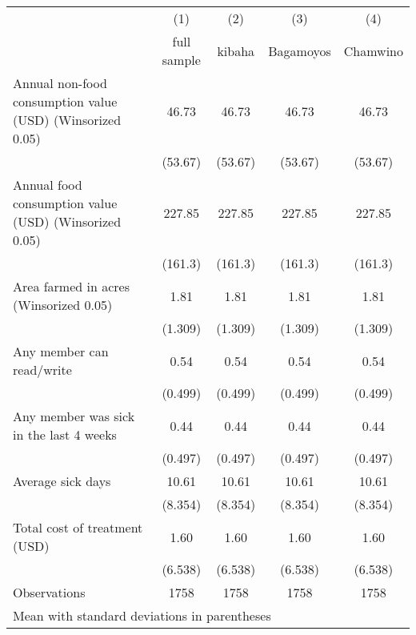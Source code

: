 {
\def\sym#1{\ifmmode^{#1}\else\(^{#1}\)\fi}
\begin{tabular}{l*{4}{c}}
\hline\hline
                    &\multicolumn{1}{c}{(1)}&\multicolumn{1}{c}{(2)}&\multicolumn{1}{c}{(3)}&\multicolumn{1}{c}{(4)}\\
                    &\multicolumn{1}{c}{full sample}&\multicolumn{1}{c}{kibaha}&\multicolumn{1}{c}{Bagamoyos}&\multicolumn{1}{c}{Chamwino}\\
\hline
Annual non-food consumption value (USD) (Winsorized 0.05)&       46.73         &       46.73         &       46.73         &       46.73         \\
                    &     (53.67)         &     (53.67)         &     (53.67)         &     (53.67)         \\
[1em]
Annual food consumption value (USD) (Winsorized 0.05)&      227.85         &      227.85         &      227.85         &      227.85         \\
                    &     (161.3)         &     (161.3)         &     (161.3)         &     (161.3)         \\
[1em]
Area farmed in acres (Winsorized 0.05)&        1.81         &        1.81         &        1.81         &        1.81         \\
                    &     (1.309)         &     (1.309)         &     (1.309)         &     (1.309)         \\
[1em]
Any member can read/write&        0.54         &        0.54         &        0.54         &        0.54         \\
                    &     (0.499)         &     (0.499)         &     (0.499)         &     (0.499)         \\
[1em]
Any member was sick in the last 4 weeks&        0.44         &        0.44         &        0.44         &        0.44         \\
                    &     (0.497)         &     (0.497)         &     (0.497)         &     (0.497)         \\
[1em]
Average sick days   &       10.61         &       10.61         &       10.61         &       10.61         \\
                    &     (8.354)         &     (8.354)         &     (8.354)         &     (8.354)         \\
[1em]
Total cost of treatment (USD)&        1.60         &        1.60         &        1.60         &        1.60         \\
                    &     (6.538)         &     (6.538)         &     (6.538)         &     (6.538)         \\
\hline
Observations        &        1758         &        1758         &        1758         &        1758         \\
\hline\hline
\multicolumn{5}{l}{\footnotesize Mean with standard deviations in parentheses}\\
\end{tabular}
}

